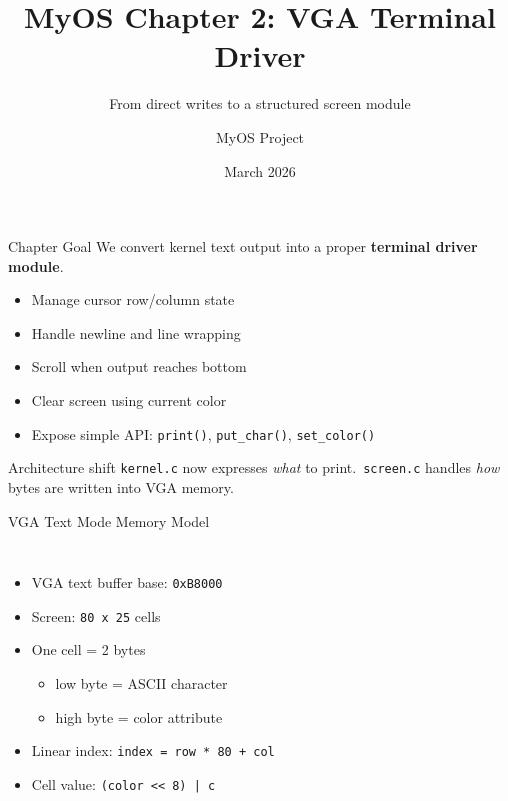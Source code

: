 \documentclass[aspectratio=169]{beamer}
\title[MyOS Chapter 2]{\textbf{MyOS Chapter 2: VGA Terminal Driver}}
\subtitle{From direct writes to a structured screen module}
\author{MyOS Project}
\date{March 2026}
\institute{Bare-metal x86, freestanding C}
\newcommand{\concept}[2]{%
  \begin{block}{#1}\smallskip #2\smallskip\end{block}\vspace{5pt}}
\begin{document}
\begin{frame}
  \titlepage
\end{frame}

\begin{frame}{Chapter Goal}
  We convert kernel text output into a proper \textbf{terminal driver module}.
  \begin{itemize}
    \item Manage cursor row/column state
    \item Handle newline and line wrapping
    \item Scroll when output reaches bottom
    \item Clear screen using current color
    \item Expose simple API: \texttt{print()}, \texttt{put\_char()}, \texttt{set\_color()}
  \end{itemize}
  \vspace{6pt}
  \concept{Architecture shift}{
    \texttt{kernel.c} now expresses \textit{what} to print.\
    \texttt{screen.c} handles \textit{how} bytes are written into VGA memory.
  }
\end{frame}

\begin{frame}{VGA Text Mode Memory Model}
  \begin{columns}[T]
    \begin{itemize}
      \item VGA text buffer base: \texttt{0xB8000}
      \item Screen: \texttt{80 x 25} cells
      \item One cell = 2 bytes
      \begin{itemize}
        \item low byte = ASCII character
        \item high byte = color attribute
      \end{itemize}
      \item Linear index: \texttt{index = row * 80 + col}
      \item Cell value: \texttt{(color << 8) | c}
    \end{itemize}
    \begin{center}
    \end{center}
  \end{columns}
\end{frame}
\end{document}
